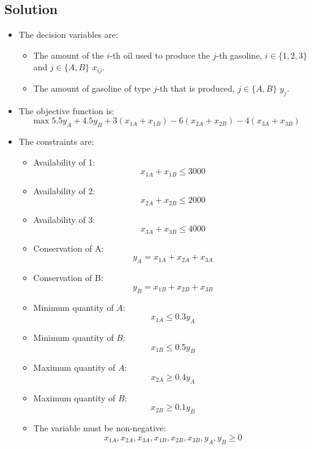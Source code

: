 \documentclass[12pt, a4paper]{report}
\begin{document}
    \subsection*{Solution}
        \begin{itemize}
            \item The decision variables are:
                \begin{itemize}
                    \item The amount of the $i$-th oil used to produce the $j$-th gasoline, $i \in \{1,2,3\}$ and $j \in \{A,B\}$ $x_{ij}$. 
                    \item The amount of gasoline of type $j$-th that is produced, $j \in \{A,B\}$ $y_j$. 
                \end{itemize}
            \item The objective function is: 
                \[\max{5.5y_A+4.5y_B+3(x_{1A}+x_{1B})-6(x_{2A}+x_{2B})-4(x_{3A}+x_{3B})}\]
            \item The constraints are:
                \begin{itemize}
                    \item Availability of 1: 
                        \[x_{1A}+x_{1B} \leq 3 000\]
                    \item Availability of 2:
                        \[x_{2A}+x_{2B} \leq 2 000\]
                    \item Availability of 3:  
                        \[x_{3A}+x_{3B} \leq 4 000\]
                    \item Conservation of A:
                        \[y_A=x_{1A}+x_{2A}+x_{3A}\]
                    \item Conservation of B:
                        \[y_B=x_{1B}+x_{2B}+x_{3B}\]
                    \item Minimum quantity of $A$: 
                        \[x_{1A} \leq 0.3y_A\]
                    \item Minimum quantity of $B$: 
                        \[x_{1B} \leq 0.5y_B\]
                    \item Maximum quantity of $A$: 
                        \[x_{2A} \geq 0.4y_A\]
                    \item Maximum quantity of $B$: 
                        \[x_{2B} \geq 0.1y_B\]
                    \item The variable must be non-negative: 
                        \[x_{1A},x_{2A},x_{3A},x_{1B},x_{2B},x_{3B},y_A,y_B \geq 0\]  
                \end{itemize}
        \end{itemize}
\end{document}
